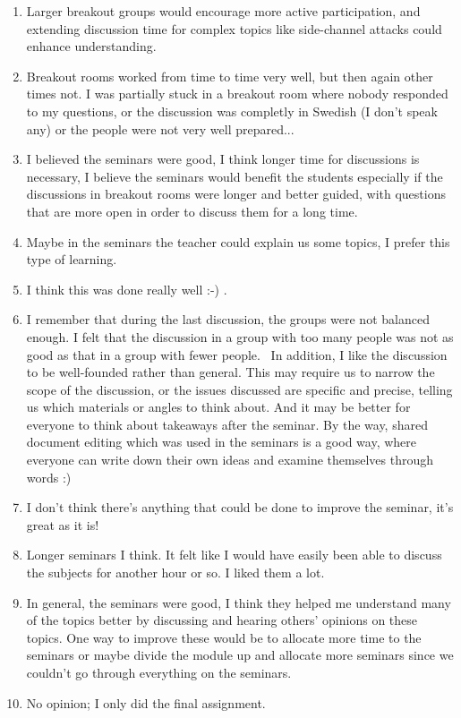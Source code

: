 \documentclass[a4paper]{report}
\begin{document}
\begin{enumerate}
  \item Larger breakout groups would encourage more active participation, and extending discussion time for complex topics like side-channel attacks could enhance understanding.
  \item Breakout rooms worked from time to time very well, but then again other times not. I was partially stuck in a breakout room where nobody responded to my questions, or the discussion was completly in Swedish (I don't speak any) or the people were not very well prepared...
  \item I believed the seminars were good, I think longer time for discussions is necessary, I believe the seminars would benefit the students especially if the discussions in breakout rooms were longer and better guided, with questions that are more open in order to discuss them for a long time.
  \item Maybe in the seminars the teacher could explain us some topics, I prefer this type of learning. 
  \item I think this was done really well :-) .
  \item I remember that during the last discussion, the groups were not balanced enough. I felt that the discussion in a group with too many people was not as good as that in a group with fewer people.   In addition, I like the discussion to be well-founded rather than general. This may require us to narrow the scope of the discussion, or the issues discussed are specific and precise, telling us which materials or angles to think about. And it may be better for everyone to think about takeaways after the seminar.  By the way, shared document editing which was used in the seminars is a good way, where everyone can write down their own ideas and examine themselves through words :)
  \item I don't think there's anything that could be done to improve the seminar, it's great as it is!
  \item Longer seminars I think. It felt like I would have easily been able to discuss the subjects for another hour or so. I liked them a lot. 
  \item In general, the seminars were good, I think they helped me understand many of the topics better by discussing and hearing others' opinions on these topics. One way to improve these would be to allocate more time to the seminars or maybe divide the module up and allocate more seminars since we couldn't go through everything on the seminars. 
  \item No opinion; I only did the final assignment.

\end{enumerate}
\end{document}
